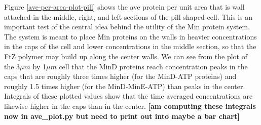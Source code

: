 \documentclass[letterpaper,twocolumn,amsmath,amssymb,pre]{revtex4-1}
\newcommand{\red}[1]{{\bf \color{red} #1}}
\newcommand{\fixme}[1]{\red{[#1]}}
\begin{document}
Figure \ref{ave-per-area-plot-pill} shows the ave protein per unit
area that is wall attached in the middle, right, and left sections of
the pill shaped cell.  This is an important test of the central idea
behind the utility of the Min protein system.  The system is meant to
place Min proteins on the walls in heavier concentrations in the caps
of the cell and lower concentrations in the middle section, so that
the FtZ polymer may build up along the center walls.  We can see from
the plot of the 3$\mu m$ by 1$\mu m$ cell that the MinD proteins reach
concentration peaks in the caps that are roughly three times higher
(for the MinD-ATP proteins) and roughly 1.5 times higher (for the
MinD-MinE-ATP) than peaks in the center.  Integrals of these plotted
values show that the time averaged concentrations are likewise higher
in the caps than in the center.  \fixme{am computing these integrals
  now in ave_plot.py but need to print out into maybe a bar chart}
\end{document}
